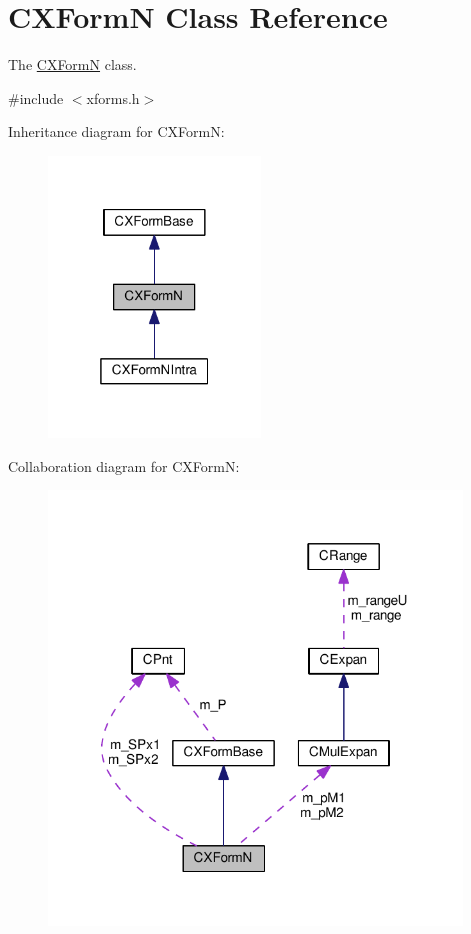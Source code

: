 \hypertarget{classCXFormN}{\section{C\-X\-Form\-N Class Reference}
\label{classCXFormN}
}


The \hyperlink{classCXFormN}{C\-X\-Form\-N} class.  




{\ttfamily \#include $<$xforms.\-h$>$}



Inheritance diagram for C\-X\-Form\-N\-:\nopagebreak
\begin{figure}[H]
\begin{center}
\leavevmode
\includegraphics[width=160pt]{classCXFormN__inherit__graph}
\end{center}
\end{figure}


Collaboration diagram for C\-X\-Form\-N\-:\nopagebreak
\begin{figure}[H]
\begin{center}
\leavevmode
\includegraphics[width=311pt]{classCXFormN__coll__graph}
\end{center}
\end{figure}
